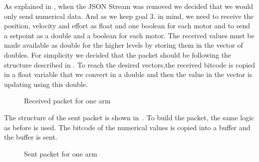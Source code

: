 As explained in , when the JSON Stream was removed we decided that we would only send numerical data. And as we keep goal 3. in mind, we need to receive the position, velocity and effort as float and one boolean for each motor and to send a setpoint as a double and a boolean for each motor.
The received values must be made available as double for the higher levels by storing them in the vector of doubles. For simplicity we decided that the packet should be following the structure described in . To reach the desired vectors,the received bitcode is copied in a float variable that we convert in a double and then the value in the vector is updating using this double.

\begin{figure}[H]
\centering
{}
\caption{Received packet for one arm}
\label{received_packet}
\end{figure}

The structure of the sent packet is shown in~. To build the packet, the same logic as before is used. The bitcode of the numerical values is copied into a buffer and the buffer is sent.

\begin{figure}[H]
\centering
{}
\caption{Sent packet for one arm}
\label{sent_packet}
\end{figure}